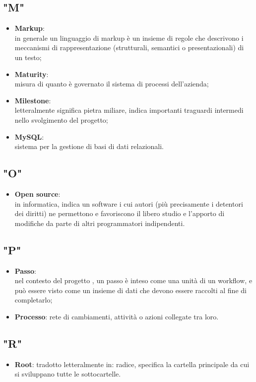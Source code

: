 \subsection{"M"}
\begin{itemize}
\item \textbf{Markup}:\\ in generale un linguaggio di markup è un insieme di regole che descrivono i meccanismi di rappresentazione (strutturali, semantici o presentazionali) di un testo;
\item \textbf{Maturity}:\\ misura di quanto è governato il sistema di processi dell'azienda;
\item \textbf{Milestone}:\\ letteralmente significa pietra miliare, indica importanti traguardi intermedi nello svolgimento del progetto;
\item \textbf{MySQL}:\\ sistema per la gestione di basi di dati relazionali.
\end{itemize}

\subsection{"O"}
\begin{itemize}
\item \textbf{Open source}:\\ in informatica, indica un software i cui autori (più precisamente i detentori dei diritti) ne permettono e favoriscono il libero studio e l'apporto di modifiche da parte di altri programmatori indipendenti.
\end{itemize}

\subsection{"P"}
\begin{itemize}
\item \textbf{Passo}:\\ nel contesto del progetto \progetto, un passo è inteso come una unità di un workflow, e può essere visto come un insieme di dati che devono essere raccolti al fine di completarlo;
\item \textbf{Processo}: rete di cambiamenti, attività o azioni collegate tra loro.
\end{itemize}
\subsection{"R"}
\begin{itemize}
\item \textbf{Root}: tradotto letteralmente in: radice, specifica la cartella principale da cui si sviluppano tutte le sottocartelle.
\end{itemize}
